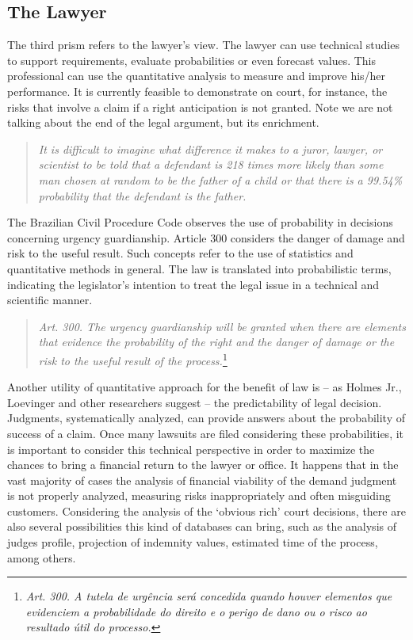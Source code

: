 \documentclass[a4paper]{exam}
\theoremstyle{plain}
\begin{document}
\subsection{The Lawyer}

The third prism refers to the lawyer's view. The lawyer can use technical studies to support requirements, evaluate probabilities or even forecast values. This professional can use the quantitative analysis to measure and improve his/her performance. It is currently feasible to demonstrate on court, for instance, the risks that involve a claim if a right anticipation is not granted. Note we are not talking about the end of the legal argument, but its enrichment.

\begin{quote}
\textit{It is difficult to imagine what difference it makes to a juror, lawyer, or scientist to be told that a defendant is 218 times more likely than some man chosen at random to be the father of a child or that there is a 99.54\% probability that the defendant is the father.} \cite[p. 343]{loevinger1992standards}
\end{quote}

The Brazilian Civil Procedure Code observes the use of probability in decisions concerning urgency guardianship. Article 300 considers the danger of damage and risk to the useful result. Such concepts refer to the use of statistics and quantitative methods in general. The law is translated into probabilistic terms, indicating the legislator's intention to treat the legal issue in a technical and scientific manner.

\begin{quote}
\textit{Art. 300. The urgency guardianship will be granted when there are elements that evidence the probability of the right and the danger of damage or the risk to the useful result of the process.}\footnote{\textit{Art. 300. A tutela de urgência será concedida quando houver elementos que evidenciem a probabilidade do direito e o perigo de dano ou o risco ao resultado útil do processo.}} \cite{brasil2015lei}
\end{quote}

Another utility of quantitative approach for the benefit of law is -- as Holmes Jr., Loevinger and other researchers suggest -- the predictability of legal decision. Judgments, systematically analyzed, can provide answers about the probability of success of a claim. Once many lawsuits are filed considering these probabilities, it is important to consider this technical perspective in order to maximize the chances to bring a financial return to the lawyer or office. It happens that in the vast majority of cases the analysis of financial viability of the demand judgment is not properly analyzed, measuring risks inappropriately and often misguiding customers. Considering the analysis of the `obvious rich' court decisions, there are also several possibilities this kind of databases can bring, such as the analysis of judges profile, projection of indemnity values, estimated time of the process, among others.
\end{document}
